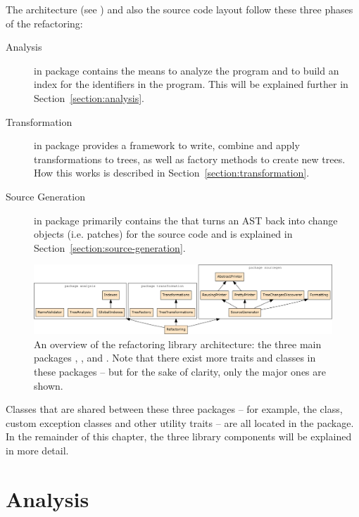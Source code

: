 The architecture (see ) and also the source code layout follow these three phases of the refactoring:

\begin{description}
 \item[Analysis] in package  contains the means to analyze the program and to build an index for the identifiers in the program. This will be explained further in Section~\vref{section:analysis}.
 \item[Transformation] in package  provides a framework to write, combine and apply transformations to trees, as well as factory methods to create new trees. How this works is described in Section~\vref{section:transformation}.
 \item[Source Generation] in package  primarily contains the  that turns an AST back into change objects (i.e. patches) for the source code and is explained in Section~\vref{section:source-generation}.
\end{description}

\begin{figure}
  \centering
  \includegraphics[width=\linewidth]{refactoring-architecture.pdf}
  \caption{An overview of the refactoring library architecture: the three main packages , , and . Note that there exist more traits and classes in these packages -- but for the sake of clarity, only the major ones are shown.}
  \label{figure:refactoring-architecture}
\end{figure}

Classes that are shared between these three packages -- for example, the  class, custom exception classes and other utility traits -- are all located in the  package. In the remainder of this chapter, the three library components will be explained in more detail. 

\section{Analysis} \label{section:analysis}

